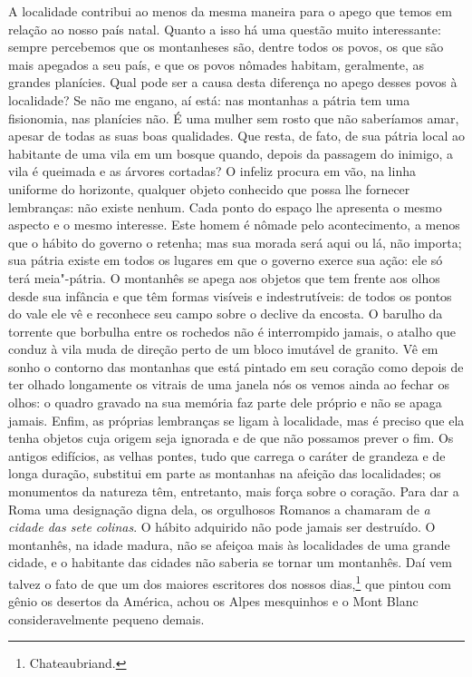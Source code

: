  A localidade contribui ao menos da mesma maneira para o apego que temos
em relação ao nosso país natal. Quanto a isso há uma questão muito
interessante: sempre percebemos que os montanheses são, dentre todos os
povos, os que são mais apegados a seu país, e que os povos nômades
habitam, geralmente, as grandes planícies. Qual pode ser a causa desta
diferença no apego desses povos à localidade? Se não me engano, aí
está: nas montanhas a pátria tem uma fisionomia, nas planícies não. É
uma mulher sem rosto que não saberíamos amar, apesar de todas as suas
boas qualidades. Que resta, de fato, de sua pátria local ao habitante
de uma vila em um bosque quando, depois da passagem do inimigo, a vila
é queimada e as árvores cortadas? O infeliz procura em vão, na linha
uniforme do horizonte, qualquer objeto conhecido que possa lhe fornecer
lembranças: não existe nenhum. Cada ponto do espaço lhe apresenta o
mesmo aspecto e o mesmo interesse. Este homem é nômade pelo
acontecimento, a menos que o hábito do governo o retenha; mas sua
morada será aqui ou lá, não importa; sua pátria existe em todos os
lugares em que o governo exerce sua ação: ele só terá meia"-pátria.
O montanhês se apega aos objetos que tem frente aos olhos desde sua
infância e que têm formas visíveis e indestrutíveis: de todos os pontos
do vale ele vê e reconhece seu campo sobre o declive da encosta. O
barulho da torrente que borbulha entre os rochedos não é interrompido
jamais, o atalho que conduz à vila muda de direção perto de um bloco
imutável de granito. Vê em sonho o contorno das montanhas que está
pintado em seu coração como depois de ter olhado longamente os vitrais
de uma janela nós os vemos ainda ao fechar os olhos: o quadro gravado
na sua memória faz parte dele próprio e não se apaga jamais. Enfim, as
próprias lembranças se ligam à localidade, mas é preciso que ela tenha
objetos cuja origem seja ignorada e de que não possamos prever o fim.
Os antigos edifícios, as velhas pontes, tudo que carrega o caráter de
grandeza e de longa duração, substitui em parte as montanhas na afeição
das localidades; os monumentos da natureza têm, entretanto, mais força
sobre o coração. Para dar a Roma uma designação digna dela, os
orgulhosos Romanos a chamaram de \textit{a cidade das sete
}\textit{colinas}. O hábito adquirido não pode jamais ser destruído. O
montanhês, na idade madura, não se afeiçoa mais às localidades de uma
grande cidade, e o habitante das cidades não saberia se tornar um
montanhês. Daí vem talvez o fato de que um dos maiores escritores dos
nossos dias,\footnote{ Chateaubriand.} que pintou com gênio os
desertos da América, achou os Alpes mesquinhos e o Mont Blanc
consideravelmente pequeno demais.

